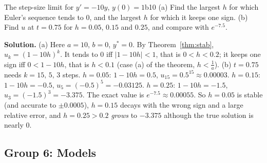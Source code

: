 \documentclass[11pt]{article}
\begin{document}
\begin{exmp}{The step-size limit for $y'=-10y$, $y(0)=1$}{b10}
(a) Find the largest $h$ for which Euler's sequence tends to $0$, and the largest $h$ for which it keeps one sign. (b) Find $u$ at $t=0.75$ for $h=0.05$, $0.15$ and $0.25$, and compare with $e^{-7.5}$.

\textbf{Solution.} (a) Here $a=10$, $b=0$, $y^*=0$. By Theorem~\ref{thm:stab}, $u_k=(1-10h)^k$. It tends to $0$ iff $\lvert1-10h\rvert<1$, that is $0<h<0.2$; it keeps one sign iff $0<1-10h$, that is $h<0.1$ (case (a) of the theorem, $h<\frac1a$).
(b) $t=0.75$ needs $k=15,\,5,\,3$ steps. $h=0.05$: $1-10h=0.5$, $u_{15}=0.5^{15}\approx0.00003$. $h=0.15$: $1-10h=-0.5$, $u_5=(-0.5)^5=-0.03125$. $h=0.25$: $1-10h=-1.5$, $u_3=(-1.5)^3=-3.375$. The exact value is $e^{-7.5}\approx0.00055$. So $h=0.05$ is stable (and accurate to $\pm0.0005$), $h=0.15$ decays with the wrong sign and a large relative error, and $h=0.25>0.2$ \emph{grows} to $-3.375$ although the true solution is nearly $0$.
\end{exmp}

\subsection*{Group 6: Models}
\end{document}
